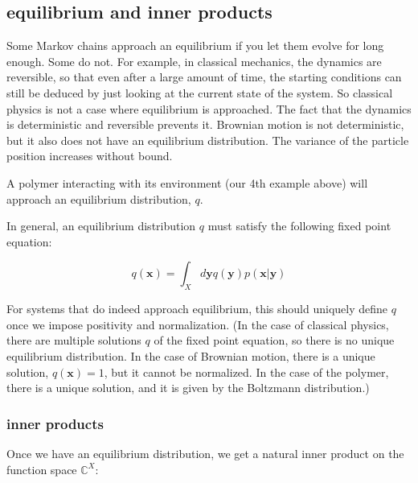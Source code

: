 \documentclass[]{article}
\newcommand{\p}[1]{\left( #1 \right)}
\newcommand{\w}[1]{\mathbf{#1}}
\newcommand{\CC}{\mathbb{C}}
\newcommand{\Kp}{\mathcal{K}}
\begin{document}
\subsection{equilibrium and inner products}

Some Markov chains approach an equilibrium if you let them evolve for long enough. Some do not. For example, in classical mechanics, the dynamics are reversible, so that even after a large amount of time, the starting conditions can still be deduced by just looking at the current state of the system. So classical physics is not a case where equilibrium is approached. The fact that the dynamics is deterministic and reversible prevents it. Brownian motion is not deterministic, but it also does not have an equilibrium distribution. The variance of the particle position increases without bound.

A polymer interacting with its environment (our 4th example above) will approach an equilibrium distribution, $q$.

In general, an equilibrium distribution $q$ must satisfy the following fixed point equation:

$$
q(\w{x}) = \int_X d\w{y} q(\w{y}) p(\w{x}|\w{y})
$$

For systems that do indeed approach equilibrium, this should uniquely define $q$ once we impose positivity and normalization. (In the case of classical physics, there are multiple solutions $q$ of the fixed point equation, so there is no unique equilibrium distribution. In the case of Brownian motion, there is a unique solution, $q(\w{x}) = 1$, but it cannot be normalized. In the case of the polymer, there is a unique solution, and it is given by the Boltzmann distribution.)

\subsubsection{inner products}

Once we have an equilibrium distribution, we get a natural inner product on the function space $\CC^X$:
\end{document}
